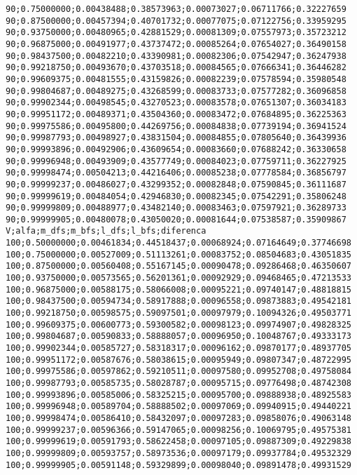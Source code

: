 \documentclass[brazil,times]{abnt}
\begin{document}
{\begin{verbatim}
90;0.75000000;0.00438488;0.38573963;0.00073027;0.06711766;0.32227659
90;0.87500000;0.00457394;0.40701732;0.00077075;0.07122756;0.33959295
90;0.93750000;0.00480965;0.42881529;0.00081309;0.07557973;0.35723212
90;0.96875000;0.00491977;0.43737472;0.00085264;0.07654027;0.36490158
90;0.98437500;0.00482210;0.43390981;0.00082306;0.07542947;0.36247938
90;0.99218750;0.00493670;0.43703518;0.00084565;0.07666341;0.36446282
90;0.99609375;0.00481555;0.43159826;0.00082239;0.07578594;0.35980548
90;0.99804687;0.00489275;0.43268599;0.00083733;0.07577282;0.36096858
90;0.99902344;0.00498545;0.43270523;0.00083578;0.07651307;0.36034183
90;0.99951172;0.00489371;0.43504360;0.00083472;0.07684895;0.36225363
90;0.99975586;0.00495800;0.44269756;0.00084838;0.07739194;0.36941524
90;0.99987793;0.00498927;0.43831504;0.00084855;0.07805640;0.36439936
90;0.99993896;0.00492906;0.43609654;0.00083660;0.07688242;0.36330658
90;0.99996948;0.00493909;0.43577749;0.00084023;0.07759711;0.36227925
90;0.99998474;0.00504213;0.44216406;0.00085238;0.07778584;0.36856797
90;0.99999237;0.00486027;0.43299352;0.00082848;0.07590845;0.36111687
90;0.99999619;0.00484054;0.42946830;0.00082345;0.07542291;0.35806248
90;0.99999809;0.00488977;0.43482140;0.00083463;0.07597921;0.36289733
90;0.99999905;0.00480078;0.43050020;0.00081644;0.07538587;0.35909867
V;alfa;m_dfs;m_bfs;l_dfs;l_bfs;diferenca
100;0.50000000;0.00461834;0.44518437;0.00068924;0.07164649;0.37746698
100;0.75000000;0.00527009;0.51113261;0.00083752;0.08504683;0.43051835
100;0.87500000;0.00560408;0.55167145;0.00090478;0.09286468;0.46350607
100;0.93750000;0.00573565;0.56201361;0.00092929;0.09468465;0.47213533
100;0.96875000;0.00588175;0.58066008;0.00095221;0.09740147;0.48818815
100;0.98437500;0.00594734;0.58917888;0.00096558;0.09873883;0.49542181
100;0.99218750;0.00598575;0.59097501;0.00097979;0.10094326;0.49503771
100;0.99609375;0.00600773;0.59300582;0.00098123;0.09974907;0.49828325
100;0.99804687;0.00590833;0.58888057;0.00096950;0.10048767;0.49333173
100;0.99902344;0.00585727;0.58318317;0.00096162;0.09870177;0.48937705
100;0.99951172;0.00587676;0.58038615;0.00095949;0.09807347;0.48722995
100;0.99975586;0.00597862;0.59210511;0.00097580;0.09952708;0.49758084
100;0.99987793;0.00585735;0.58028787;0.00095715;0.09776498;0.48742308
100;0.99993896;0.00585006;0.58325215;0.00095700;0.09888938;0.48925583
100;0.99996948;0.00589704;0.58888502;0.00097069;0.09940915;0.49440221
100;0.99998474;0.00586410;0.58432097;0.00097283;0.09858076;0.49063148
100;0.99999237;0.00596366;0.59147065;0.00098256;0.10069795;0.49575381
100;0.99999619;0.00591793;0.58622458;0.00097105;0.09887309;0.49229838
100;0.99999809;0.00593757;0.58973536;0.00097179;0.09937784;0.49532329
100;0.99999905;0.00591148;0.59329899;0.00098040;0.09891478;0.49931529
\end{verbatim} }
\end{document}
